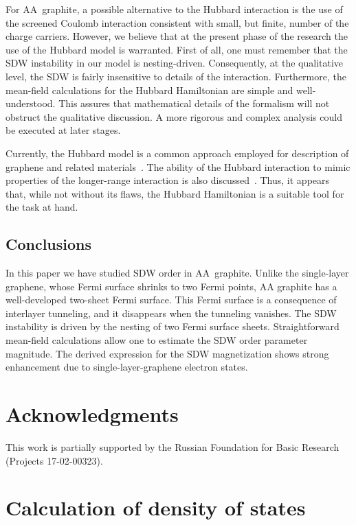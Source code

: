 \documentclass[prb,twocolumn,showpacs,aps,superscriptaddress,floatfix]{revtex4}
\begin{document}
For AA~graphite, a possible alternative to the Hubbard interaction is the
use of the screened Coulomb interaction consistent with small, but finite,
number of the charge carriers. However, we believe that at the present
phase of the research the use of the Hubbard model is warranted. First of
all, one must remember that the SDW instability in our model is
nesting-driven. Consequently, at the qualitative level, the SDW is fairly
insensitive to details of the interaction. Furthermore, the mean-field
calculations for the Hubbard Hamiltonian are simple and well-understood.
This assures that mathematical details of the formalism will not obstruct
the qualitative discussion. A more rigorous and complex analysis could be
executed at later stages.

Currently, the Hubbard model is a common approach employed for description
of graphene and related
materials~\cite{Nilsson2006,Dillenschneider2008,
lang_af_hubb2012,af_ab_hubb2013,sun_hub_mc_afm2014}.
The ability of the Hubbard interaction to mimic properties of the
longer-range interaction is also
discussed~\cite{EffCoulomb}.
Thus, it appears that, while not without its flaws, the Hubbard Hamiltonian
is a suitable tool for the task at hand.

\subsection{Conclusions}

In this paper we have studied SDW order in AA~graphite. Unlike the
single-layer graphene, whose Fermi surface shrinks to two Fermi points, AA
graphite has a well-developed two-sheet Fermi surface. This Fermi surface
is a consequence of interlayer tunneling, and it disappears when the
tunneling vanishes. The SDW instability is driven by the nesting of two
Fermi surface sheets. Straightforward mean-field calculations allow one to
estimate the SDW order parameter magnitude. The derived expression for the
SDW magnetization shows strong enhancement due to single-layer-graphene
electron states.

\section*{Acknowledgments}  This work is partially supported by the Russian
Foundation for Basic Research (Projects 17-02-00323).

\appendix

\section{Calculation of density of states}
\label{app::dos}
\end{document}
